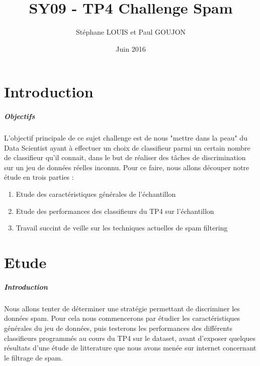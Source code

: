 \documentclass{report}
\begin{document}

\title{SY09 - TP4 Challenge Spam}
\date{Juin 2016}
\author{Stéphane LOUIS et Paul GOUJON}
\maketitle

\newpage
\tableofcontents{}

\newpage
{}
\chapter{Introduction}

\paragraph{Objectifs}
L'objectif principale de ce sujet challenge est de nous "mettre dans la peau" du Data Scientist ayant à effectuer un choix de classifieur parmi un certain nombre de classifieur qu'il connait, dans le but de réaliser des tâches de discrimination sur un jeu de données réelles inconnu. Pour ce faire, nous allons découper notre étude en trois parties :

\begin{enumerate}
    \item Etude des caractéristiques générales de l'échantillon
    \item Etude des performances des classifieurs du TP4 sur l'échantillon
    \item Travail succint de veille sur les techniques actuelles de spam filtering
\end{enumerate}

\chapter{Etude}

\paragraph{Introduction}
Nous allons tenter de déterminer une stratégie permettant de discriminer les données spam. Pour cela nous commencerons par étudier les caractéristiques générales du jeu de données, puis testerons les performances des différents classifieurs programmés au cours du TP4 sur le dataset, avant d'exposer quelques résultats d'une étude de litterature que nous avons menée sur internet concernant le filtrage de spam.
\end{document}

